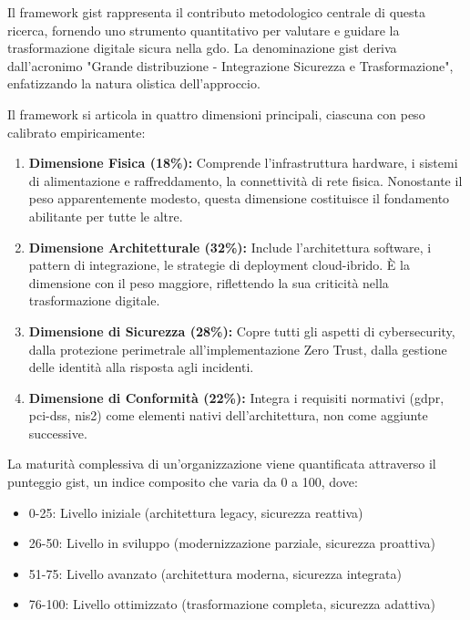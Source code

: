 Il framework \gls{gist} rappresenta il contributo metodologico centrale di questa ricerca, fornendo uno strumento quantitativo per valutare e guidare la trasformazione digitale sicura nella \gls{gdo}. La denominazione \gls{gist} deriva dall'acronimo "Grande distribuzione - Integrazione Sicurezza e Trasformazione", enfatizzando la natura olistica dell'approccio.

Il framework si articola in quattro dimensioni principali, ciascuna con peso calibrato empiricamente:

\begin{enumerate}
\item \textbf{Dimensione Fisica (18\%):} Comprende l'infrastruttura hardware, i sistemi di alimentazione e raffreddamento, la connettività di rete fisica. Nonostante il peso apparentemente modesto, questa dimensione costituisce il fondamento abilitante per tutte le altre.

\item \textbf{Dimensione Architetturale (32\%):} Include l'architettura software, i pattern di integrazione, le strategie di deployment cloud-ibrido. È la dimensione con il peso maggiore, riflettendo la sua criticità nella trasformazione digitale.

\item \textbf{Dimensione di Sicurezza (28\%):} Copre tutti gli aspetti di cybersecurity, dalla protezione perimetrale all'implementazione Zero Trust, dalla gestione delle identità alla risposta agli incidenti.

\item \textbf{Dimensione di Conformità (22\%):} Integra i requisiti normativi (\gls{gdpr}, \gls{pci-dss}, \gls{nis2}) come elementi nativi dell'architettura, non come aggiunte successive.
\end{enumerate}

La maturità complessiva di un'organizzazione viene quantificata attraverso il punteggio \gls{gist}, un indice composito che varia da 0 a 100, dove:
\begin{itemize}
\item 0-25: Livello iniziale (architettura legacy, sicurezza reattiva)
\item 26-50: Livello in sviluppo (modernizzazione parziale, sicurezza proattiva)
\item 51-75: Livello avanzato (architettura moderna, sicurezza integrata)
\item 76-100: Livello ottimizzato (trasformazione completa, sicurezza adattiva)
\end{itemize}

